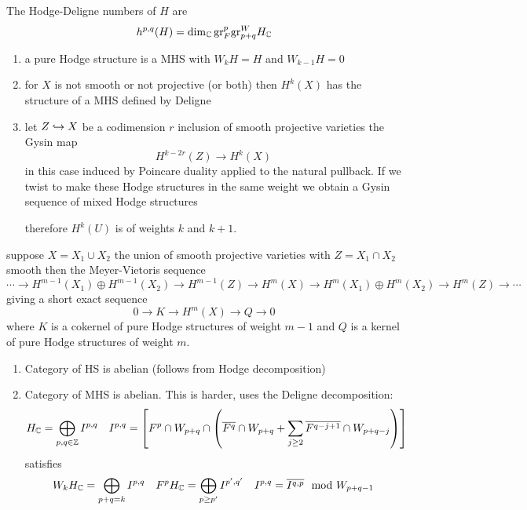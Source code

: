 \documentclass[12pt]{article}
\renewcommand{\gr}{\mathrm{gr}}
\begin{document}
\begin{defn}
The Hodge-Deligne numbers of $H$ are 
\[ h^{p,q}(H) = \dim_{\CC} \gr_F^p \gr_{p+q}^W H_{\CC} \]
\end{defn}

\begin{example}
\begin{enumerate}
\item a pure Hodge structure is a MHS with $W_k H = H$ and $W_{k-1} H = 0$
\item for $X$ is not smooth or not projective (or both) then $H^k(X)$ has the structure of a MHS defined by Deligne
\item let $Z \hookrightarrow X$ be a codimension $r$ inclusion of smooth projective varieties the Gysin map
\[ H^{k - 2r}(Z) \to H^k(X) \]
in this case induced by Poincare duality applied to the natural pullback. If we twist to make these Hodge structures in the same weight we obtain a Gysin sequence of mixed Hodge structures
\begin{center}
\end{center}
therefore $H^k(U)$ is of weights $k$ and $k+1$. 
\end{enumerate}
\item suppose $X = X_1 \cup X_2$ the union of smooth projective varieties with $Z = X_1 \cap X_2$ smooth then the Meyer-Vietoris sequence
\[ \cdots \to H^{m-1}(X_1) \oplus H^{m-1}(X_2) \to H^{m-1}(Z) \to H^m(X) \to H^m(X_1) \oplus H^m(X_2) \to H^m(Z) \to \cdots \]
giving a short exact sequence
\[ 0 \to K \to H^m(X) \to Q \to 0 \]
where $K$ is a cokernel of pure Hodge structures of weight $m-1$ and $Q$ is a kernel of pure Hodge structures of weight $m$. 
\end{example}

\begin{rmk}
\begin{enumerate}
\item Category of HS is abelian (follows from Hodge decomposition)
\item Category of MHS is abelian. This is harder, uses the Deligne decomposition:
\[ H_{\mathbb{C}} = \bigoplus_{p,q \in \mathbb{Z}} I^{p,q} \quad I^{p,q} = \left[ F^p \cap W_{p+q} \cap \left( \overline{F^q} \cap W_{p+q} + \sum_{j \ge 2} \overline{F^{q - j + 1}} \cap W_{p+q-j} \right) \right] \]
satisfies
\[ W_k H_{\mathbb{C}} = \bigoplus_{p+q = k} I^{p,q} \quad F^p H_{\mathbb{C}} = \bigoplus_{p \ge p'} I^{p', q'} \quad I^{p,q} = \overline{I^{q,p}} \mod W_{p+q-1} \]
\end{enumerate}
\end{rmk}
\end{document}
